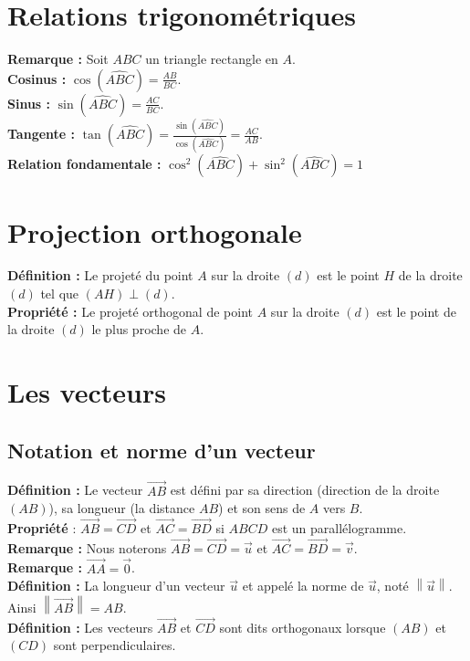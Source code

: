 \documentclass[a4paper,titlepage]{article}
\let\oldsection\section
\renewcommand\section{\clearpage\oldsection}
\begin{document}
\section{Relations trigonométriques}
    \textbf{Remarque :} Soit $ABC$ un triangle rectangle en $A$.
    \\
    \textbf{Cosinus :} $\cos\left(\widehat{ABC}\right)=\frac{AB}{BC}$.
    \\
    \textbf{Sinus :} $\sin\left(\widehat{ABC}\right)=\frac{AC}{BC}$.
    \\
    \textbf{Tangente :} $\tan\left(\widehat{ABC}\right)=\frac{\sin\left(\widehat{ABC}\right)}{\cos\left(\widehat{ABC}\right)}=\frac{AC}{AB}$.
    \\
    \textbf{Relation fondamentale :} $\cos^{2}\left(\widehat{ABC}\right)+\sin^{2}\left(\widehat{ABC}\right)=1$
\section{Projection orthogonale}
    \textbf{Définition :} Le projeté du point $A$ sur la droite $\left(d\right)$ est le point $H$ de la droite $\left(d\right)$ tel que $\left(AH\right)\perp\left(d\right)$.
    \\
    \textbf{Propriété :} Le projeté orthogonal de point $A$ sur la droite $\left(d\right)$ est le point de la droite $\left(d\right)$ le plus proche de $A$.
\section{Les vecteurs}
    \subsection{Notation et norme d’un vecteur}
        \textbf{Définition :} Le vecteur $\overrightarrow{AB}$ est défini par sa direction (direction de la droite $\left(AB\right)$), sa longueur (la distance $AB$) et son sens de $A$ vers $B$.
        \\
        \textbf{Propriété} : $\overrightarrow{AB}=\overrightarrow{CD}$ et $\overrightarrow{AC}=\overrightarrow{BD}$ si $ABCD$ est un parallélogramme.
        \\
        \textbf{Remarque :} Nous noterons $\overrightarrow{AB}=\overrightarrow{CD}=\vec{u}$ et $\overrightarrow{AC}=\overrightarrow{BD}=\vec{v}$.
        \\
        \textbf{Remarque :} $\overrightarrow{AA}=\overrightarrow{0}$.
        \\
        \textbf{Définition :} La longueur d’un vecteur $\vec{u}$ et appelé la norme de $\vec{u}$, noté $\left\|\vec{u}\right\|$. Ainsi $\left\|\overrightarrow{AB}\right\|=AB$.
        \\
        \textbf{Définition :} Les vecteurs $\overrightarrow{AB}$ et $\overrightarrow{CD}$ sont dits orthogonaux lorsque $\left(AB\right)$ et $\left(CD\right)$ sont perpendiculaires.
\end{document}
